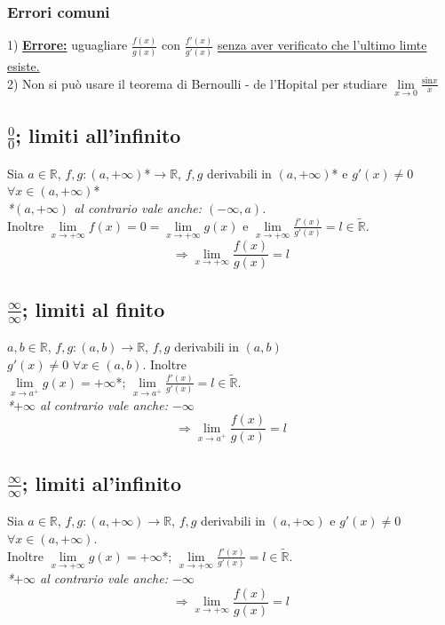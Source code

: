\documentclass{article}
\newcommand{\R}{\mathbb{R}}
\newcommand{\Rext}{\widetilde{\mathbb{R}}}
\begin{document}
\begin{flushleft}
\subsubsection{Errori comuni}
1) \underline{\textbf{Errore:}} uguagliare $\frac{f(x)}{g(x)}$ con $\frac{f'(x)}{g'(x)}$ \underline{senza aver verificato che l'ultimo limte esiste.}\\
2) Non si può usare il teorema di Bernoulli - de l'Hopital per studiare $\lim\limits_{x \to 0}\frac{\text{sin}x}{x}$

\subsection{$\frac{0}{0}$; limiti all'infinito}
Sia $a \in \R$, $f,g: (a, + \infty)$*$ \rightarrow \R$, $f, g$ derivabili in $(a, + \infty)$* e $g'(x) \neq 0$ $\forall x \in (a, + \infty)$*\\
\textit{*$(a, +\infty)$ al contrario vale anche: $(- \infty, a)$.}\\
Inoltre $\lim\limits_{x \to + \infty}f(x) = 0 = \lim\limits_{x \to + \infty}g(x)$ e $\lim\limits_{x \to +\infty}\frac{f'(x)}{g'(x)} =l \in \Rext$.\\
\[ \Rightarrow \lim\limits_{x \to +\infty}\frac{f(x)}{g(x)} = l\]

\subsection{$\frac{\infty}{\infty}$; limiti al finito}
$a, b \in \R$, $f, g:(a,b) \rightarrow \R$, $f,g $ derivabili in $(a,b)$\\
$g'(x) \neq 0$ $\forall x \in (a,b)$. Inoltre\\
$\lim\limits_{x \to a^+}g(x) = +\infty$*; $\lim\limits_{x \to a^+}\frac{f'(x)}{g'(x)} = l \in \Rext$.\\
\textit{*$+\infty$ al contrario vale anche: $-\infty$}\\
\[ \Rightarrow \lim\limits_{x \to a^+}\frac{f(x)}{g(x)} = l\]

\subsection{$\frac{\infty}{\infty}$; limiti al'infinito}
Sia $a \in \R$, $f,g: (a, + \infty) \rightarrow \R$, $f, g$ derivabili in $(a, + \infty)$ e $g'(x) \neq 0$ $\forall x \in (a, + \infty)$.\\
Inoltre $\lim\limits_{x \to + \infty}g(x) = +\infty$*; $\lim\limits_{x \to +\infty}\frac{f'(x)}{g'(x)} = l \in \Rext$.\\
\textit{*$+\infty$ al contrario vale anche: $-\infty$}\\
\[ \Rightarrow \lim\limits_{x \to +\infty}\frac{f(x)}{g(x)} = l\]


\end{flushleft}
\end{document}
